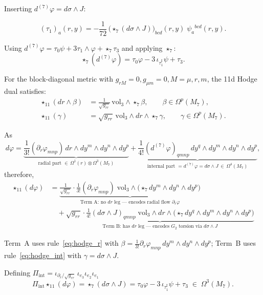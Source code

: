 \documentclass[a4paper,11pt,fleqn]{article}
\theoremstyle{plain}
\theoremstyle{definition}
\newcommand{\vp}{\varphi}
\newcommand{\ps}{\psi}
\newcommand{\ta}{\tau}
\newcommand{\vthree}{\mathrm{vol}_3}
\newcommand{\Pint}{\Pi_{\mathrm{int}}}
\newcommand{\grr}{g_{rr}}
\newcommand{\iot}[1]{\iota_{#1}}
\newcommand{\str}{\star_7}
\newcommand{\sEl}{\star_{11}}
\begin{document}
Inserting $d^{(7)}\vp = d\sigma\wedge J$:

\[
  (\ta_1)_a(r,y)
  = -\frac{1}{72}\,\bigl(\str(d\sigma\wedge J)\bigr)_{bcd}(r,y)\;
    \ps_a{}^{bcd}(r,y).
\]

Using $d^{(7)}\vp = \ta_0\ps+3\ta_1\wedge\vp+\str\ta_3$ and applying $\str$:
\[
  \str(d^{(7)}\vp)
  = \ta_0\vp - 3\,\iot{\ta_1^\sharp}\ps + \ta_3.
\]


For the block-diagonal metric with $g_{rM}=0, g_{\mu m}=0, M=\mu, r, m$, the 11d Hodge dual satisfies:
\begin{align}
  \sEl(dr\wedge\beta)
  &= \frac{1}{\sqrt{\grr}}\,\vthree\wedge\str\beta,
  \qquad \beta\in\Omega^p(M_7),
  \label{eq:hodge_r}\\
  \sEl(\gamma)
  &= \sqrt{\grr}\,\vthree\wedge dr\wedge\str\gamma,
  \qquad \gamma\in\Omega^p(M_7).
  \label{eq:hodge_int}
\end{align}
\noindent


As
\[
  d\vp
  = \underbrace{\frac{1}{3!}(\partial_r\vp_{mnp})\,dr\wedge dy^m\wedge dy^n\wedge dy^p}_{
      \text{radial part }\in\,\Omega^1(r)\otimes\Omega^3(M_7)}
  + \underbrace{\frac{1}{4!}(d^{(7)}\vp)_{qmnp}\,dy^q\wedge dy^m\wedge dy^n\wedge dy^p}_{
      \text{internal part }= d^{(7)}\vp = d\sigma\wedge J\,\in\,\Omega^4(M_7)},
\]
therefore,
\begin{align*}
  \sEl(d\vp)
  &= \underbrace{
      \frac{1}{\sqrt{\grr}}\cdot\frac{1}{3!}
      (\partial_r\vp_{mnp})\;\vthree\wedge\bigl(\str dy^m\wedge dy^n\wedge dy^p\bigr)
    }_{\displaystyle\text{Term A: no }dr\text{ leg --- encodes radial flow }\partial_r\vp}\\
  &\quad
    +\underbrace{
      \sqrt{\grr}\cdot\frac{1}{4!}(d\sigma\wedge J)_{qmnp}\;
      \vthree\wedge dr\wedge\bigl(\str dy^q\wedge dy^m\wedge dy^n\wedge dy^p\bigr)
    }_{\displaystyle\text{Term B: has }dr\text{ leg --- encodes }G_2\text{ torsion via }d\sigma\wedge J}
\end{align*}

\noindent
Term~A uses rule~\eqref{eq:hodge_r} with $\beta=\tfrac{1}{3!}\partial_r\vp_{mnp}\,dy^m\wedge dy^n\wedge dy^p$;
Term~B uses rule~\eqref{eq:hodge_int} with $\gamma=d\sigma\wedge J$.

Defining $\Pint = \iot{\partial_r/\sqrt{\grr}}\,\iot{e_3}\iot{e_2}\iot{e_1}$
\[
  \Pint\sEl(d\vp)
  = \str(d\sigma\wedge J)
  = \ta_0\vp - 3\,\iot{\ta_1^\sharp}\ps + \ta_3
  \;\in\;\Omega^3(M_7).
\]
\end{document}
